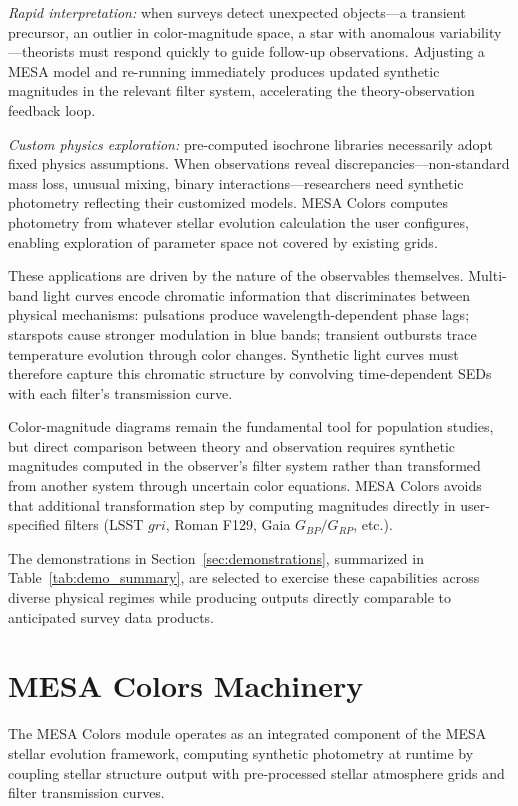 \documentclass[linenumbers,apj,twocolumn, floatfix]{aastex701} \usepackage{amsmath} \usepackage{longtable} \usepackage{graphicx} \usepackage{ulem} \usepackage{xcolor} \usepackage{lettrine} \usepackage{yfonts} \usepackage{rotating}
\begin{document}
\textit{Rapid interpretation:} when surveys detect unexpected objects—a transient precursor, an outlier in color-magnitude space, a star with anomalous variability—theorists must respond quickly to guide follow-up observations.
Adjusting a MESA model and re-running immediately produces updated synthetic magnitudes in the relevant filter system, accelerating the theory-observation feedback loop.

\textit{Custom physics exploration:} pre-computed isochrone libraries necessarily adopt fixed physics assumptions.
When observations reveal discrepancies—non-standard mass loss, unusual mixing, binary interactions—researchers need synthetic photometry reflecting their customized models.
MESA Colors computes photometry from whatever stellar evolution calculation the user configures, enabling exploration of parameter space not covered by existing grids.

These applications are driven by the nature of the observables themselves.
Multi-band light curves encode chromatic information that discriminates between physical mechanisms: pulsations produce wavelength-dependent phase lags; starspots cause stronger modulation in blue bands; transient outbursts trace temperature evolution through color changes.
Synthetic light curves must therefore capture this chromatic structure by convolving time-dependent SEDs with each filter's transmission curve.

Color-magnitude diagrams remain the fundamental tool for population studies, but direct comparison between theory and observation requires synthetic magnitudes computed in the observer's filter system rather than transformed from another system through uncertain color equations.
MESA Colors avoids that additional transformation step by computing magnitudes directly in user-specified filters (LSST $gri$, Roman F129, Gaia $G_{BP}/G_{RP}$, etc.).

The demonstrations in Section~\ref{sec:demonstrations}, summarized in Table~\ref{tab:demo_summary}, are selected to exercise these capabilities across diverse physical regimes while producing outputs directly comparable to anticipated survey data products.

\section{MESA Colors Machinery}
\label{sec:methods}

The MESA Colors module operates as an integrated component of the MESA stellar evolution framework, computing synthetic photometry at runtime by coupling stellar structure output with pre-processed stellar atmosphere grids and filter transmission curves.
\end{document}
